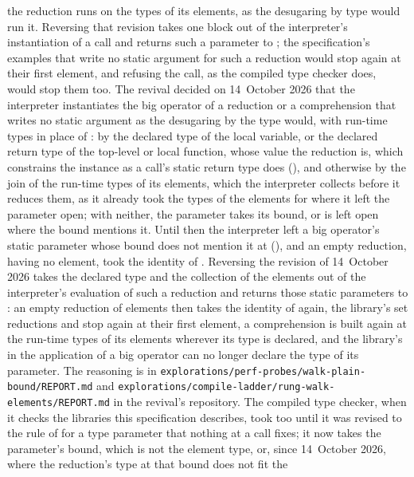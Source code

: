 \begin{description}
the reduction runs on the types of its elements, as the desugaring by type
would run it.
Reversing that revision takes one block out of the interpreter's
instantiation of a call and returns such a parameter to ; the
specification's examples that write no static argument for such a reduction
would stop again at their first element, and refusing the call, as the compiled
type checker does, would stop them too.
The revival decided on 14~October 2026 that the interpreter instantiates the
big operator of a reduction or a comprehension that writes no static argument
as the desugaring by the type  would, with run-time types in place of
: by the declared type of the local variable, or the declared return
type of the top-level or local function, whose value the reduction is, which
constrains the instance as a call's static return type
does (), and otherwise by the join of the
run-time types of its elements, which the interpreter collects before it
reduces them, as it already took the types of the elements for  where
it left the parameter open; with neither, the parameter takes its bound, or is
left open where the bound mentions it.
Until then the interpreter left a big operator's static parameter whose bound
does not mention it at  (), and an
empty reduction, having no element, took the identity of
.
Reversing the revision of 14~October 2026 takes the declared type and the
collection of the elements out of the interpreter's evaluation of such a
reduction and returns those static parameters to : an empty
reduction of  elements then takes the identity of
 again, the library's set reductions \EXP{\bigcup} and
\EXP{\bigcap} stop again at their first element, a comprehension is built
again at the run-time types of its elements wherever its type is declared, and
the library's  in the application of a big operator can no longer
declare the type of its parameter.
The reasoning is in
\nolinkurl{explorations/perf-probes/walk-plain-bound/REPORT.md} and
\nolinkurl{explorations/compile-ladder/rung-walk-elements/REPORT.md} in the
revival's repository.
The compiled type checker, when it checks the libraries this specification
describes, took  too until it was revised to the rule of
 for a type parameter that nothing at a call
fixes; it now takes the parameter's bound, which is not the element type, or,
since 14~October 2026, where the reduction's type at that bound does not fit the

\end{description}
